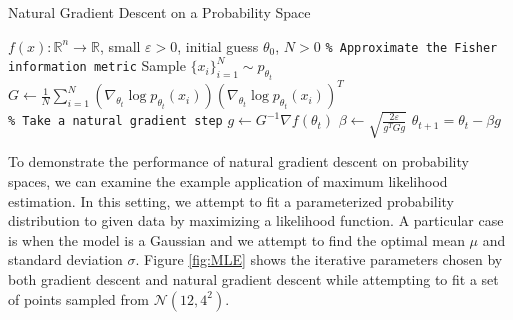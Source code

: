 \documentclass[twoside,10pt]{article}
\begin{document}
{\centering
\begin{minipage}{0.7\linewidth}
\begin{algorithm}[H]
    \caption{Natural Gradient Descent on a Probability Space}
    \label{alg:NGD-prob}
    \begin{algorithmic}
        \Require $f(x) : \mathbb{R}^n \to \mathbb{R}$, small $\varepsilon > 0$, initial guess $\theta_0$, $N > 0$
            \State \texttt{\color{blue}\% Approximate the Fisher information metric}
            \State Sample $\{x_i\}_{i=1}^N \sim p_{\theta_t}$
            \State $G \gets \frac{1}{N} \sum_{i=1}^N (\nabla_{\theta_t} \log p_{\theta_t}(x_i)) (\nabla_{\theta_t} \log p_{\theta_t}(x_i))^T$ \\
            
            \State \texttt{\color{blue}\% Take a natural gradient step}
            \State $g \gets G^{-1} \nabla f(\theta_t)$
            \State $\beta \gets \sqrt{\frac{2 \varepsilon}{g^T G g}}$
            \State $\theta_{t+1} = \theta_t - \beta g$
        \EndWhile
    \end{algorithmic}
\end{algorithm}
\end{minipage}
\par}
\vspace{7mm}

To demonstrate the performance of natural gradient descent on probability spaces, we can examine the example application of maximum likelihood estimation. In this setting, we attempt to fit a parameterized probability distribution to given data by maximizing a likelihood function. A particular case is when the model is a Gaussian and we attempt to find the optimal mean $\mu$ and standard deviation $\sigma$. Figure \ref{fig:MLE} shows the iterative parameters chosen by both gradient descent and natural gradient descent while attempting to fit a set of points sampled from $\mathcal{N}(12, 4^2)$.
\end{document}
